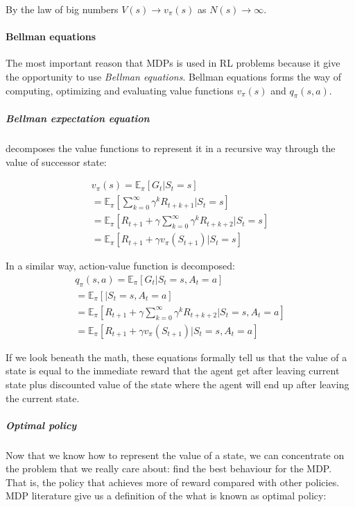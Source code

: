 By the law of big numbers $V(s) \rightarrow v_{\pi}(s)$ as $N(s) \rightarrow \infty$.



\paragraph{Bellman equations} The most important reason that MDPs is used in RL problems because
it give the opportunity to use \emph{Bellman equations}. Bellman equations forms the way
of computing, optimizing and evaluating value functions $v_{\pi}(s)$ and $q_{\pi}(s, a)$.

\subparagraph{Bellman expectation equation} decomposes the value functions to represent it
in a recursive way through the value of successor state:

\begin{align*}
	v_{\pi}(s) = \mathbb{E}_{\pi} [G_t |S_t = s] \\
		= \mathbb{E}_{\pi} [\sum_{k=0}^{\infty} \gamma^k R_{t+k+1} |S_t = s] \\
		= \mathbb{E}_{\pi} [R_{t+1} + \gamma \sum_{k=0}^{\infty} \gamma^k R_{t+k+2} |S_t = s] \\
		= \mathbb{E}_{\pi} [R_{t+1} + \gamma v_{\pi}(S_{t+1}) | S_t = s]
\end{align*}

In a similar way, action-value function is decomposed:
\begin{align*}
	q_{\pi}(s, a) = \mathbb{E}_{\pi} [G_t |S_t = s, A_t = a] \\
		= \mathbb{E}_{\pi} [ |S_t = s, A_t = a] \\
		= \mathbb{E}_{\pi} [R_{t+1} + \gamma \sum_{k=0}^{\infty} \gamma^k R_{t+k+2} |S_t = s, A_t = a] \\
		= \mathbb{E}_{\pi} [R_{t+1} + \gamma v_{\pi}(S_{t+1}) | S_t = s, A_t = a]
\end{align*}

If we look beneath the math, these equations formally tell us that the value of a state is equal to the
immediate reward that the agent get after leaving current state plus discounted value
of the state where the agent will end up after leaving the current state.



\subparagraph{Optimal policy}

Now that we know how to represent the value of
a state, we can concentrate on the problem that we really care about:
find the best behaviour for the MDP. That is, the policy that achieves more of reward
compared with other policies.
MDP literature give us a definition of the what is
known as optimal policy:

